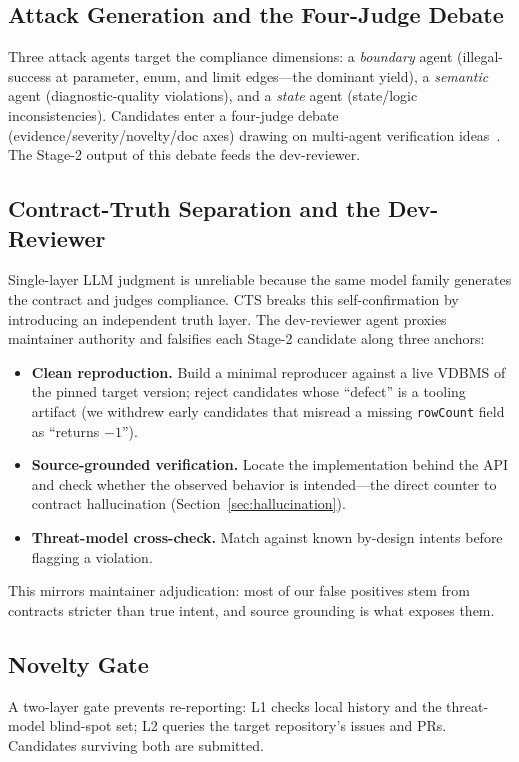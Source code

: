 \documentclass[sigconf]{acmart}
\begin{document}
\subsection{Attack Generation and the Four-Judge Debate}
Three attack agents target the compliance dimensions: a \emph{boundary} agent (illegal-success at parameter, enum, and limit edges---the dominant yield), a \emph{semantic} agent (diagnostic-quality violations), and a \emph{state} agent (state/logic inconsistencies). Candidates enter a four-judge debate (evidence/severity/novelty/doc axes) drawing on multi-agent verification ideas~\cite{du2023improving}. The Stage-2 output of this debate feeds the dev-reviewer.

\subsection{Contract-Truth Separation and the Dev-Reviewer}\label{sec:cts}
Single-layer LLM judgment is unreliable because the same model family generates the contract and judges compliance. CTS breaks this self-confirmation by introducing an independent truth layer. The dev-reviewer agent proxies maintainer authority and falsifies each Stage-2 candidate along three anchors:
\begin{itemize}[leftmargin=*,itemsep=2pt]
\item \textbf{Clean reproduction.} Build a minimal reproducer against a live VDBMS of the pinned target version; reject candidates whose ``defect'' is a tooling artifact (we withdrew early candidates that misread a missing \texttt{rowCount} field as ``returns $-1$'').
\item \textbf{Source-grounded verification.} Locate the implementation behind the API and check whether the observed behavior is intended---the direct counter to contract hallucination (Section~\ref{sec:hallucination}).
\item \textbf{Threat-model cross-check.} Match against known by-design intents before flagging a violation.
\end{itemize}
This mirrors maintainer adjudication: most of our false positives stem from contracts stricter than true intent, and source grounding is what exposes them.

\subsection{Novelty Gate}
A two-layer gate prevents re-reporting: L1 checks local history and the threat-model blind-spot set; L2 queries the target repository's issues and PRs. Candidates surviving both are submitted.
\end{document}
